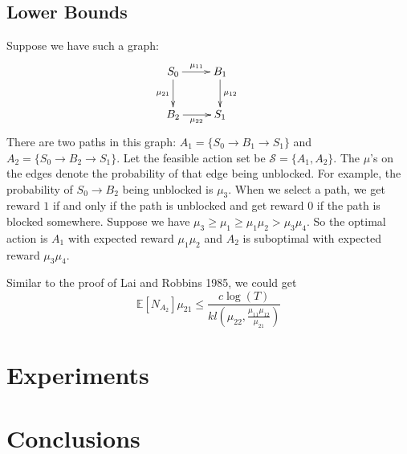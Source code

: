 \documentclass{article}
\newcommand{\EE}{\mathbb{E}}
\newcommand{\cS}{\mathcal{S}}
\begin{document}
\subsection{Lower Bounds}

Suppose we have such a graph: 
$$
  \xymatrix{
  	S_0 \ar[r]^{\mu_{11}} \ar[d]_{\mu_{21}} & B_1 \ar[d]^{\mu_{12}} &\\
  	B_2 \ar[r]_{\mu_{22}} & S_1
  }
$$
There are two paths in this graph: $A_1 = \{S_0 \to B_1 \to S_1\}$ and $A_2 = \{S_0 \to B_2 \to S_1\}$. 
Let the feasible action set be $\cS = \{A_1, A_2\}.$ The $\mu$'s on the edges denote the probability of that edge being unblocked. 
For example, the probability of $S_0 \to B_2$ being unblocked is $\mu_3$. 
When we select a path, we get reward $1$ if and only if the path is unblocked and get reward $0$ if the path is blocked somewhere. 
Suppose we have $\mu_3 \geq \mu_1 \geq \mu_1\mu_2 > \mu_3 \mu_4$.
So the optimal action is $A_1$ with expected reward $\mu_1 \mu_2$ and $A_2$ is suboptimal with expected reward $\mu_3 \mu_4$.

Similar to the proof of Lai and Robbins 1985, we could get
$$
	\EE[N_{A_2}]\mu_{21} \leq \frac{c \log(T)}{kl(\mu_{22}, \frac{\mu_{11}\mu_{12}}{\mu_{21}})}
$$


\section{Experiments}

\section{Conclusions}
\end{document}
